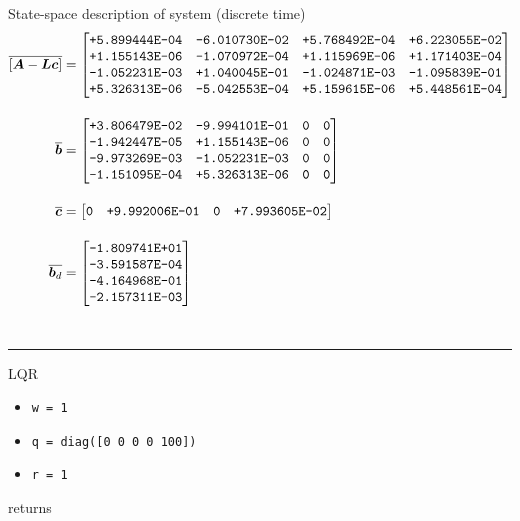 State-space description of system (discrete time)
\begin{align*}
\overline{\left[\boldsymbol{A} - \boldsymbol{L}\boldsymbol{c}\right]}
&=
\begin{bmatrix}
\texttt{+5.899444E-04} & \texttt{-6.010730E-02} & \texttt{+5.768492E-04} & \texttt{+6.223055E-02}\\
\texttt{+1.155143E-06} & \texttt{-1.070972E-04} & \texttt{+1.115969E-06} & \texttt{+1.171403E-04}\\
\texttt{-1.052231E-03} & \texttt{+1.040045E-01} & \texttt{-1.024871E-03} & \texttt{-1.095839E-01}\\
\texttt{+5.326313E-06} & \texttt{-5.042553E-04} & \texttt{+5.159615E-06} & \texttt{+5.448561E-04}
\end{bmatrix}
\\[11pt]
\overline{\boldsymbol{b}}
&=
\begin{bmatrix}
\texttt{+3.806479E-02} & \texttt{-9.994101E-01} & \texttt{0} & \texttt{0}\\
\texttt{-1.942447E-05} & \texttt{+1.155143E-06} & \texttt{0} & \texttt{0}\\
\texttt{-9.973269E-03} & \texttt{-1.052231E-03} & \texttt{0} & \texttt{0}\\
\texttt{-1.151095E-04} & \texttt{+5.326313E-06} & \texttt{0} & \texttt{0}
\end{bmatrix}
\\[11pt]
\overline{\boldsymbol{c}}
&=
\begin{bmatrix}
\texttt{0} & \texttt{+9.992006E-01} & \texttt{0} & \texttt{+7.993605E-02}
\end{bmatrix}
\\[11pt]
\overline{\boldsymbol{b}_d}
&=
\begin{bmatrix}
\texttt{-1.809741E+01}\\
\texttt{-3.591587E-04}\\
\texttt{-4.164968E-01}\\
\texttt{-2.157311E-03}
\end{bmatrix}
\end{align*}
~\rule{\textwidth}{0.5pt}
LQR
\begin{itemize}
    \item \texttt{w = 1}
    \item \texttt{q = diag([0 0 0 0 100])}
    \item \texttt{r = 1}
\end{itemize}
returns
